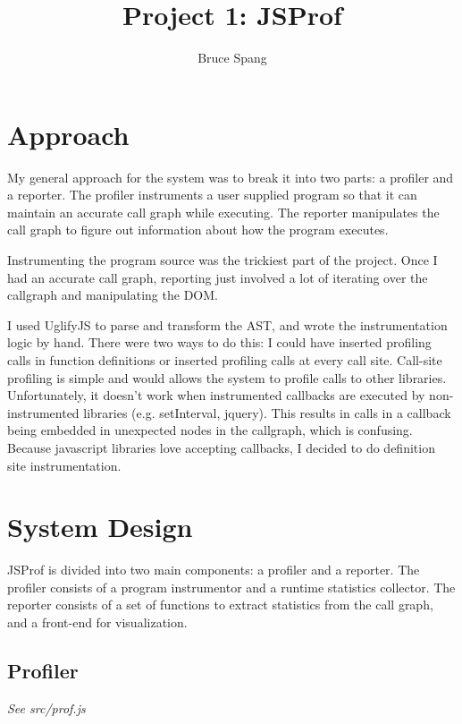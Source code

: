 \documentclass{article}
\begin{document}
\title{Project 1: JSProf}
\author{Bruce Spang}
\maketitle

\section*{Approach}

My general approach for the system was to break it into two parts: a profiler and a reporter. The profiler instruments a user supplied program so that it can maintain an accurate call graph while executing. The reporter manipulates the call graph to figure out information about how the program executes.

Instrumenting the program source was the trickiest part of the project. Once I had an accurate call graph, reporting just involved a lot of iterating over the callgraph and manipulating the DOM.

I used UglifyJS \cite{uglify} to parse and transform the AST, and wrote the instrumentation logic by hand. There were two ways to do this: I could have inserted profiling calls in function definitions or inserted profiling calls at every call site. Call-site profiling is simple and would allows the system to profile calls to other libraries. Unfortunately, it doesn't work when instrumented callbacks are executed by non-instrumented libraries (e.g. setInterval, jquery). This results in calls in a callback being embedded in unexpected nodes in the callgraph, which is confusing. Because javascript libraries love accepting callbacks, I decided to do definition site instrumentation.

\section*{System Design}

JSProf is divided into two main components: a profiler and a reporter. The profiler consists of a program instrumentor and a runtime statistics collector. The reporter consists of a set of functions to extract statistics from the call graph, and a front-end for visualization.

\subsection*{Profiler}

\textit{See src/prof.js}
\end{document}
